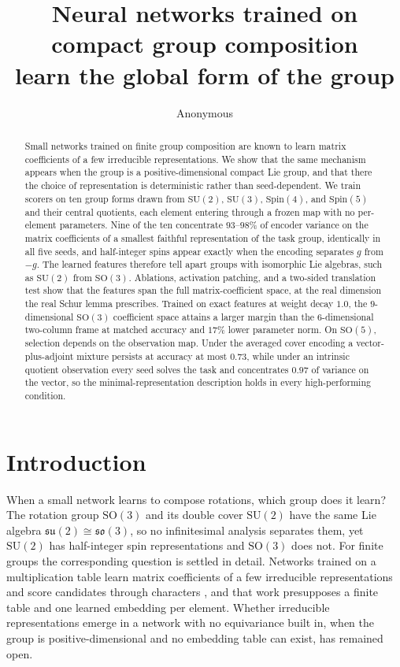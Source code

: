 \documentclass{article}
\title{Neural networks trained on compact group composition\\
learn the global form of the group}
\author{Anonymous}
\newcommand{\SU}{\mathrm{SU}}
\newcommand{\SO}{\mathrm{SO}}
\newcommand{\Spin}{\mathrm{Spin}}
\begin{document}
\maketitle

\begin{abstract}
Small networks trained on finite group composition are known to learn
matrix coefficients of a few irreducible representations. We show that
the same mechanism appears when the group is a positive-dimensional
compact Lie group, and that there the choice of representation is
deterministic rather than seed-dependent. We train scorers on ten group
forms drawn from $\SU(2)$, $\SU(3)$, $\Spin(4)$, and $\Spin(5)$ and
their central quotients, each element entering through a frozen map with
no per-element parameters. Nine of the ten concentrate $93$--$98\%$ of
encoder variance on the matrix coefficients of a smallest faithful
representation of the task group, identically in all five seeds, and
half-integer spins appear exactly when the encoding separates $g$ from
$-g$. The learned features therefore tell apart groups with isomorphic Lie
algebras, such as $\SU(2)$ from $\SO(3)$.
Ablations, activation patching, and a two-sided translation test show
that the features span the full matrix-coefficient space, at the real
dimension the real Schur lemma prescribes.
Trained on exact features at weight decay $1.0$, the $9$-dimensional
$\SO(3)$ coefficient space attains a larger margin than the
$6$-dimensional two-column frame at matched accuracy and $17\%$ lower
parameter norm. On $\SO(5)$, selection depends on the observation map. Under the
averaged cover encoding a vector-plus-adjoint mixture persists at
accuracy at most $0.73$, while under an intrinsic quotient observation
every seed solves the task and concentrates $0.97$ of variance on the
vector, so the minimal-representation description holds in every
high-performing condition.
\end{abstract}

\section{Introduction}
\label{sec:intro}

When a small network learns to compose rotations, which group does it
learn? The rotation group $\SO(3)$ and its double cover $\SU(2)$ have
the same Lie algebra $\mathfrak{su}(2) \cong \mathfrak{so}(3)$, so no
infinitesimal analysis separates them, yet $\SU(2)$ has half-integer
spin representations and $\SO(3)$ does not. For finite groups the
corresponding question is settled in detail. Networks trained on a
multiplication table learn matrix coefficients of a few irreducible
representations and score candidates through characters
\cite[Sec.~4]{chughtai2023}, and that work presupposes a finite table
and one learned embedding per element. Whether irreducible
representations emerge in a network with no equivariance built in, when
the group is positive-dimensional and no embedding table can exist, has
remained open.
\end{document}
